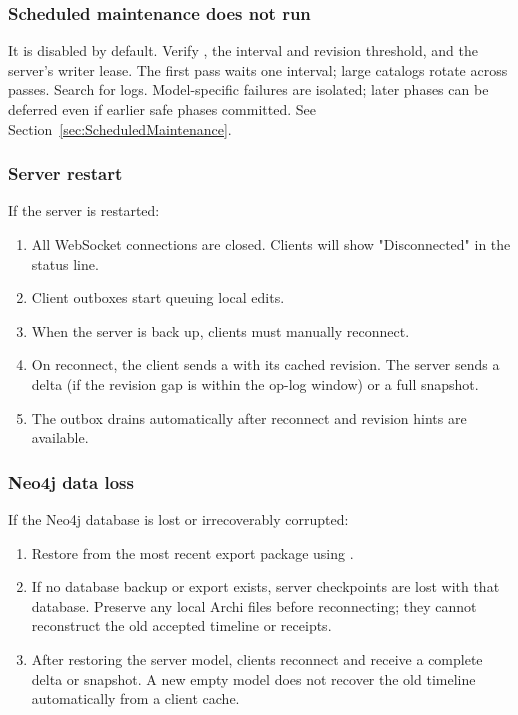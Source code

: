 \subsubsection{Scheduled maintenance does not run}

It is disabled by default. Verify
, the interval and revision
threshold, and the server's writer lease. The first pass waits one interval;
large catalogs rotate across passes. Search for 
logs. Model-specific failures are isolated; later phases can be deferred even
if earlier safe phases committed. See Section~\ref{sec:ScheduledMaintenance}.

\subsubsection{Server restart}

If the server is restarted:

\begin{enumerate}
\item All WebSocket connections are closed. Clients will show
  "Disconnected" in the status line.
\item Client outboxes start queuing local edits.
\item When the server is back up, clients must manually reconnect.
\item On reconnect, the client sends a  with its cached
  revision. The server sends a delta (if the revision gap is within the
  op-log window) or a full snapshot.
\item The outbox drains automatically after reconnect and revision hints
  are available.
\end{enumerate}

\subsubsection{Neo4j data loss}

If the Neo4j database is lost or irrecoverably corrupted:

\begin{enumerate}
\item Restore from the most recent export package using
  .
\item If no database backup or export exists, server checkpoints are lost
  with that database. Preserve any local Archi files before reconnecting;
  they cannot reconstruct the old accepted timeline or receipts.
\item After restoring the server model, clients reconnect and receive a
  complete delta or snapshot. A new empty model does not recover the old
  timeline automatically from a client cache.
\end{enumerate}

